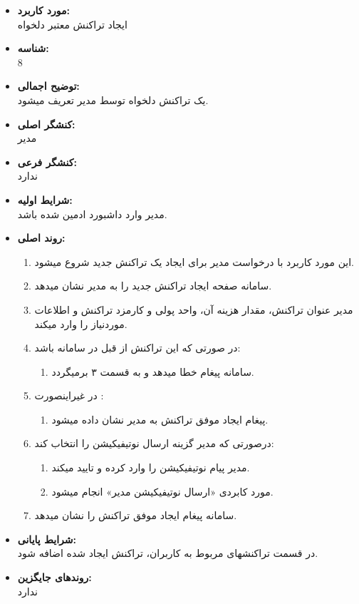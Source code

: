 \documentclass{article}
\begin{document}
\begin{itemize}
\item \textbf{مورد کاربرد:}\\
ایجاد تراکنش معتبر دلخواه
\item \textbf{شناسه:}\\
8
\item \textbf{توضیح اجمالی:}\\
یک تراکنش دلخواه توسط مدیر تعریف میشود.
\item \textbf{کنشگر اصلی:}\\
مدیر
\item \textbf{کنشگر فرعی:}\\
ندارد
\item \textbf{شرایط اولیه:}\\
مدیر وارد داشبورد ادمین شده باشد.
\item \textbf{روند اصلی:}\\
\begin{enumerate}
\item  این مورد کاربرد با درخواست مدیر برای ایجاد یک تراکنش جدید شروع میشود.
\item سامانه صفحه ایجاد تراکنش جدید را به مدیر نشان میدهد.
\item مدیر عنوان تراکنش، مقدار هزینه آن، واحد پولی و کارمزد تراکنش و اطلاعات موردنیاز را وارد میکند.
\item در صورتی که این تراکنش از قبل در سامانه باشد:
\begin{enumerate}
\item سامانه پیغام خطا میدهد و به قسمت ۳ برمیگردد. 
\end{enumerate}

\item در غیراینصورت	:
\begin{enumerate}
\item پیغام ایجاد موفق تراکنش به مدیر نشان داده میشود.
\end{enumerate}
\item  درصورتی که مدیر گزینه ارسال نوتیفیکیشن را انتخاب کند:
\begin{enumerate}
\item مدیر پیام نوتیفیکیشن را وارد کرده و تایید میکند.
\item مورد کابردی «ارسال نوتیفیکیشن مدیر» انجام میشود.
\end{enumerate}
\item سامانه پیغام ایجاد موفق تراکنش را نشان میدهد.
\end{enumerate}

\item \textbf{شرایط پایانی:}\\ 
در قسمت تراکنشهای مربوط به کاربران، تراکنش ایجاد شده اضافه شود.
\item \textbf{روندهای جایگزین:}\\
ندارد
\end{itemize}
\end{document}
